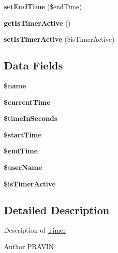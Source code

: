 \begin{DoxyCompactItemize}
\item 
\hypertarget{class_timer_a0eb2b91c055e79bbb232e24910b28d2e}{{\bfseries set\+End\+Time} (\$end\+Time)}\label{class_timer_a0eb2b91c055e79bbb232e24910b28d2e}

\item 
\hypertarget{class_timer_af788069ff5691b07f670a8cb5160c85d}{{\bfseries get\+Is\+Timer\+Active} ()}\label{class_timer_af788069ff5691b07f670a8cb5160c85d}

\item 
\hypertarget{class_timer_af523bbb34c9ed09f75c8cda91be19f31}{{\bfseries set\+Is\+Timer\+Active} (\$is\+Timer\+Active)}\label{class_timer_af523bbb34c9ed09f75c8cda91be19f31}

\end{DoxyCompactItemize}
\subsection*{Data Fields}
\begin{DoxyCompactItemize}
\item 
\hypertarget{class_timer_ab2fc40d43824ea3e1ce5d86dee0d763b}{{\bfseries \$name}}\label{class_timer_ab2fc40d43824ea3e1ce5d86dee0d763b}

\item 
\hypertarget{class_timer_a93049137e201f92ddd59be4b52c11f04}{{\bfseries \$current\+Time}}\label{class_timer_a93049137e201f92ddd59be4b52c11f04}

\item 
\hypertarget{class_timer_a80cc460d9f10104a67d9c54e68681cc6}{{\bfseries \$time\+In\+Seconds}}\label{class_timer_a80cc460d9f10104a67d9c54e68681cc6}

\item 
\hypertarget{class_timer_a404df05d2efcd6bb0551ecd8e7ae2315}{{\bfseries \$start\+Time}}\label{class_timer_a404df05d2efcd6bb0551ecd8e7ae2315}

\item 
\hypertarget{class_timer_a75394179c27e1af40be62e74571179a4}{{\bfseries \$end\+Time}}\label{class_timer_a75394179c27e1af40be62e74571179a4}

\item 
\hypertarget{class_timer_aff20833df389a26c0f9384512eec4a68}{{\bfseries \$user\+Name}}\label{class_timer_aff20833df389a26c0f9384512eec4a68}

\item 
\hypertarget{class_timer_ae315c6575aef0820f7e212e32fdd9df8}{{\bfseries \$is\+Timer\+Active}}\label{class_timer_ae315c6575aef0820f7e212e32fdd9df8}

\end{DoxyCompactItemize}


\subsection{Detailed Description}
Description of \hyperlink{class_timer}{Timer}

\begin{DoxyAuthor}{Author}
P\+R\+A\+V\+I\+N 
\end{DoxyAuthor}
